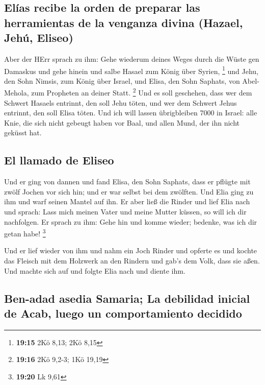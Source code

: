 \hypertarget{eluxedas-recibe-la-orden-de-preparar-las-herramientas-de-la-venganza-divina-hazael-jehuxfa-eliseo}{%
\subsection{Elías recibe la orden de preparar las herramientas de la
venganza divina (Hazael, Jehú,
Eliseo)}\label{eluxedas-recibe-la-orden-de-preparar-las-herramientas-de-la-venganza-divina-hazael-jehuxfa-eliseo}}

 Aber der HErr sprach zu ihm: Gehe wiederum deines Weges
durch die Wüste gen Damaskus und gehe hinein und salbe Hasael zum König
über Syrien, \footnote{\textbf{19:15} 2Kö 8,13; 2Kö 8,15}
 und Jehu, den Sohn Nimsis, zum König über Israel, und
Elisa, den Sohn Saphats, von Abel-Mehola, zum Propheten an deiner Statt.
\footnote{\textbf{19:16} 2Kö 9,2-3; 1Kö 19,19}  Und es
soll geschehen, dass wer dem Schwert Hasaels entrinnt, den soll Jehu
töten, und wer dem Schwert Jehus entrinnt, den soll Elisa töten.
 Und ich will lassen übrigbleiben 7000 in Israel: alle
Knie, die sich nicht gebeugt haben vor Baal, und allen Mund, der ihn
nicht geküsst hat.

\hypertarget{el-llamado-de-eliseo}{%
\subsection{El llamado de Eliseo}\label{el-llamado-de-eliseo}}

 Und er ging von dannen und fand Elisa, den Sohn Saphats,
dass er pflügte mit zwölf Jochen vor sich hin; und er war selbst bei dem
zwölften. Und Elia ging zu ihm und warf seinen Mantel auf ihn.
 Er aber ließ die Rinder und lief Elia nach und sprach:
Lass mich meinen Vater und meine Mutter küssen, so will ich dir
nachfolgen. Er sprach zu ihm: Gehe hin und komme wieder; bedenke, was
ich dir getan habe! \footnote{\textbf{19:20} Lk 9,61}

 Und er lief wieder von ihm und nahm ein Joch Rinder und
opferte es und kochte das Fleisch mit dem Holzwerk an den Rindern und
gab's dem Volk, dass sie aßen. Und machte sich auf und folgte Elia nach
und diente ihm.

\hypertarget{ben-adad-asedia-samaria-la-debilidad-inicial-de-acab-luego-un-comportamiento-decidido}{%
\subsection{Ben-adad asedia Samaria; La debilidad inicial de Acab, luego
un comportamiento
decidido}\label{ben-adad-asedia-samaria-la-debilidad-inicial-de-acab-luego-un-comportamiento-decidido}}

